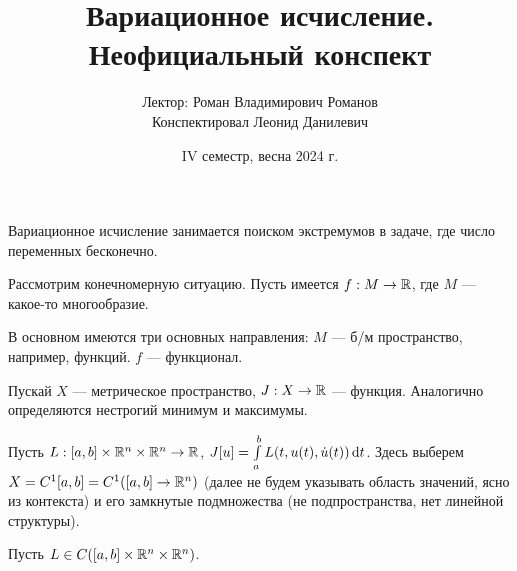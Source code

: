 \documentclass[a4paper]{report}
\date{IV семестр, весна 2024 г.}
\title{Вариационное исчисление. Неофициальный конспект}
\author{Лектор: Роман Владимирович Романов \\ Конспектировал Леонид Данилевич}
\begin{document}
    \maketitle
    \tableofcontents
    \newpage
    \setcounter{lection}{0}
    Вариационное исчисление занимается поиском экстремумов в задаче, где число переменных бесконечно.

    Рассмотрим конечномерную ситуацию. Пусть имеется $f: M \rightarrow \mathbb{R}$, где $M$ --- какое-то многообразие.

    В основном имеются три основных направления:
    $M$ --- б/м пространство, например, функций. $f$ --- функционал.

    Пускай $X$ --- метрическое пространство, $J: X \rightarrow \mathbb{R}$ --- функция.
    Аналогично определяются нестрогий минимум и максимумы.


    Пусть $L: [a, b] \times \mathbb{R}^n \times \mathbb{R}^n \rightarrow \mathbb{R}$, $J[u] = \int\limits_{a}^{b}L(t, u(t), \dot{u}(t))\operatorname{d}\! t$.
    Здесь выберем $X = C^1[a, b] = C^1([a, b] \rightarrow \mathbb{R}^n)$ (далее не будем указывать область значений, ясно из контекста) и его замкнутые подмножества (не подпространства, нет линейной структуры).

    Пусть $L \in C([a, b] \times \mathbb{R}^n \times \mathbb{R}^n)$.
\end{document}
